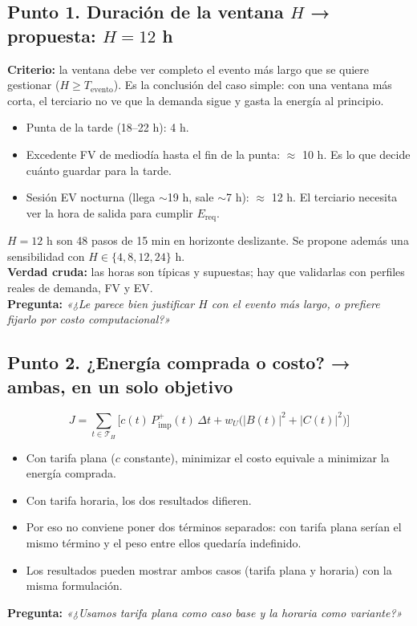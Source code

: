 \documentclass[10pt,a4paper]{article}
\begin{document}
\subsection*{Punto 1. Duración de la ventana $H$ → propuesta: $H=12$ h}
\textbf{Criterio:} la ventana debe ver completo el evento más largo que se quiere gestionar ($H\ge T_{\mathrm{evento}}$). Es la conclusión del caso simple: con una ventana más corta, el terciario no ve que la demanda sigue y gasta la energía al principio.
\begin{itemize}
  \item Punta de la tarde (18–22 h): 4 h.
  \item Excedente FV de mediodía hasta el fin de la punta: $\approx$ 10 h. Es lo que decide cuánto guardar para la tarde.
  \item Sesión EV nocturna (llega $\sim$19 h, sale $\sim$7 h): $\approx$ 12 h. El terciario necesita ver la hora de salida para cumplir $E_{\mathrm{req}}$.
\end{itemize}
$H=12$ h son 48 pasos de 15 min en horizonte deslizante. Se propone además una sensibilidad con $H\in\{4,8,12,24\}$ h.\\
\textbf{Verdad cruda:} las horas son típicas y supuestas; hay que validarlas con perfiles reales de demanda, FV y EV.\\
\textbf{Pregunta:} \emph{«¿Le parece bien justificar $H$ con el evento más largo, o prefiere fijarlo por costo computacional?»}

\subsection*{Punto 2. ¿Energía comprada o costo? → ambas, en un solo objetivo}
\[
J=\sum_{t\in\mathcal T_H}\Big[c(t)\,P^{+}_{\mathrm{imp}}(t)\,\Delta t+w_U\big(|B(t)|^2+|C(t)|^2\big)\Big]
\]
\begin{itemize}
  \item Con tarifa plana ($c$ constante), minimizar el costo equivale a minimizar la energía comprada.
  \item Con tarifa horaria, los dos resultados difieren.
  \item Por eso no conviene poner dos términos separados: con tarifa plana serían el mismo término y el peso entre ellos quedaría indefinido.
  \item Los resultados pueden mostrar ambos casos (tarifa plana y horaria) con la misma formulación.
\end{itemize}
\textbf{Pregunta:} \emph{«¿Usamos tarifa plana como caso base y la horaria como variante?»}
\end{document}
